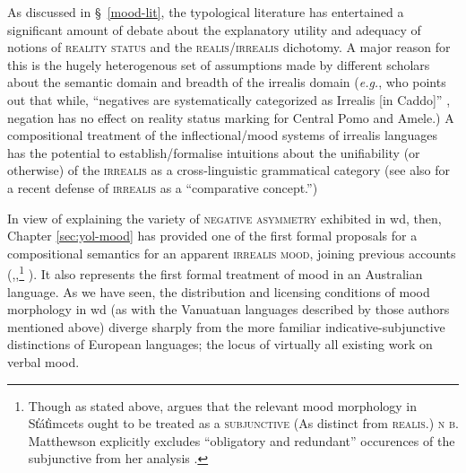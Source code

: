 %
%
%




As discussed in \S~\ref{mood-lit}, the typological literature has entertained a significant amount of debate about the explanatory utility and adequacy of notions of \textsc{reality status} and the \textsc{realis/irrealis} dichotomy. A major reason for this is the hugely heterogenous set of assumptions made by different scholars about the semantic domain and breadth of the irrealis domain (\textit{e.g.}, \citeauthor{Mithun1995} who points out that while, ``negatives are systematically categorized as Irrealis [in Caddo]'' \citeyearpar[380]{Mithun1995}, negation has no effect on reality status marking for Central Pomo and Amele.) A compositional treatment of the inflectional/mood systems of irrealis languages has the potential to establish/formalise intuitions about the unifiability (or otherwise) of the \textsc{irrealis} as a cross-linguistic grammatical category (see also \citeauthor{VonPrincea} for a recent defense of \textsc{irrealis} as a ``comparative concept.'')

In view of explaining the variety of \textsc{negative asymmetry} exhibited in \gls{wd}, then, Chapter \ref{sec:yol-mood} has provided one of the first formal proposals for a compositional semantics for an apparent \textsc{irrealis mood}, joining previous accounts (\citealp[\textit{e.g.},][]{Krifka2016},\citealp{Matthewson2010},\footnote{Though as stated above, \citet[13]{Matthewson2010} argues that the relevant mood morphology in  St̓át̓imcets ought to be treated as a \textsc{subjunctive} (As distinct from \textsc{realis}.) \textsc{n\kern -2pt b.} Matthewson explicitly excludes ``obligatory and redundant'' occurences of the subjunctive from her analysis \citeyearpar[26]{Matthewson2010}.} \citealp{VonPrince2018}). It also represents the first formal treatment of mood in an Australian language. As we have seen, the distribution and licensing conditions of mood morphology in \gls{wd} (as with the Vanuatuan languages described by those authors mentioned above) diverge sharply from the more familiar indicative-subjunctive distinctions of European languages; the locus of virtually all existing work on verbal mood. 


